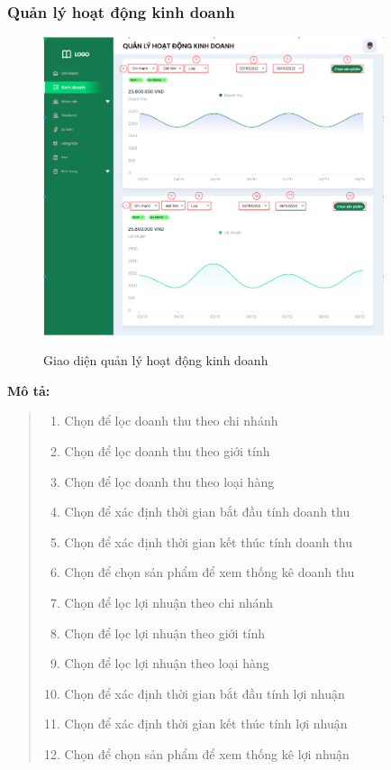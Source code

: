     \subsubsection{Quản lý hoạt động kinh doanh}
        \begin{figure}[!htp]
            \centering
            \includegraphics[width=10cm]{img/UI/admin/business.png}
            \label{22}
            \newline
            \caption{Giao diện quản lý hoạt động kinh doanh}
        \end{figure}
        \textbf{Mô tả:}  
        \begin{quote}
            \begin{enumerate}
                \item Chọn để lọc doanh thu theo chi nhánh 
                \item Chọn để lọc doanh thu theo giới tính
                \item Chọn để lọc doanh thu theo loại hàng
                \item Chọn để xác định  thời gian bắt đầu tính doanh thu
                \item Chọn để xác định thời gian kết thúc tính doanh thu
                \item Chọn để chọn sản phẩm để xem thống kê doanh thu
                \item Chọn để lọc lợi nhuận theo chi nhánh 
                \item Chọn để lọc lợi nhuận theo giới tính
                \item Chọn để lọc lợi nhuận theo loại hàng
                \item Chọn để xác định  thời gian bắt đầu tính lợi nhuận
                \item Chọn để xác định thời gian kết thúc tính lợi nhuận
                \item Chọn để chọn sản phẩm để xem thống kê lợi nhuận
            \end{enumerate}
        \end{quote}
    
